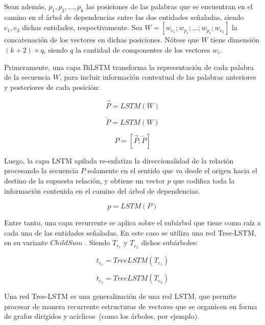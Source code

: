 Sean además, $p_1, p_2,\dots, p_k$ las posiciones de las palabras que se encuentran en el camino en el árbol de dependencias entre las dos entidades señaladas, siendo $e_1,e_2$ dichas entidades, respectivamente. Sea $W = [w_{e_1};w_{p_1};\dots;w_{p_k};w_{e_2}]$ la concatenación de los vectores en dichas posiciones. Nótese que $W$ tiene dimensión $(k+2) \times q$, siendo $q$ la cantidad de componentes de los vectores $w_i$.

Primeramente, una capa BiLSTM transforma la representación de cada palabra de la secuencia $W$, para incluir información contextual de las palabras anteriores y posteriores de cada posición:

\begin{equation*}
\overrightarrow{P} = LSTM(W)
\end{equation*}

\begin{equation*}
\overleftarrow{P} = LSTM(W)
\end{equation*}

\begin{equation*}
P = [\overrightarrow{P};\overleftarrow{P}]
\end{equation*}

Luego, la capa LSTM apilada re-enfatiza la direccionalidad de la relación procesando la secuencia $P$ solamente en el sentido que va desde el origen hacia el destino de la supuesta relación, y obtiene un vector $p$ que codifica toda la información contenida en el camino del árbol de dependencias.

\begin{equation*}
p = LSTM(P)
\end{equation*}

Entre tanto, una capa recurrente se aplica sobre el subárbol que tiene como raíz a cada una de las entidades señaladas.
En este caso se utiliza una red Tree-LSTM, en su variante $Child Sum$ \cite{treeLSTM}.
Siendo $T_{e_1}$ y $T_{e_2}$ dichos subárboles:

\begin{equation*}
	t_{e_1} = TreeLSTM(T_{e_1})
\end{equation*}


\begin{equation*}
	t_{e_2} = TreeLSTM(T_{e_2})
\end{equation*}


Una red Tree-LSTM es una generalización de una red LSTM, que permite procesar de manera recurrente estructuras de vectores que se organicen en forma de grafos dirigidos y acíclicos~(como los árboles, por ejemplo). 

